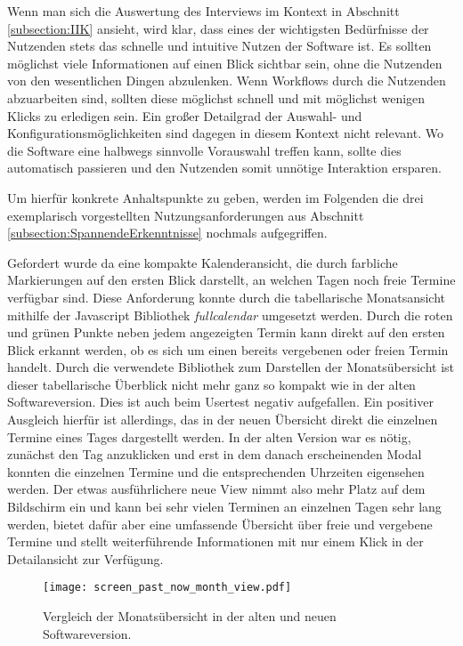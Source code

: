 Wenn man sich die Auswertung des Interviews im Kontext in Abschnitt
\ref{subsection:IIK} ansieht, wird klar, dass eines der wichtigsten Bedürfnisse
der Nutzenden stets das schnelle und intuitive Nutzen der Software ist. Es
sollten möglichst viele Informationen auf einen Blick sichtbar sein, ohne die
Nutzenden von den wesentlichen Dingen abzulenken. Wenn Workflows durch die
Nutzenden abzuarbeiten sind, sollten diese möglichst schnell und mit möglichst
wenigen Klicks zu erledigen sein. Ein großer Detailgrad der Auswahl- und
Konfigurationsmöglichkeiten sind dagegen in diesem Kontext nicht relevant. Wo
die Software eine halbwegs sinnvolle Vorauswahl treffen kann, sollte dies
automatisch passieren und den Nutzenden somit unnötige Interaktion ersparen.

Um hierfür konkrete Anhaltspunkte zu geben, werden im Folgenden die drei
exemplarisch vorgestellten Nutzungsanforderungen aus Abschnitt
\ref{subsection:SpannendeErkenntnisse} nochmals aufgegriffen.

Gefordert wurde da eine kompakte Kalenderansicht, die durch farbliche
Markierungen auf den ersten Blick darstellt, an welchen Tagen noch freie
Termine verfügbar sind. Diese Anforderung konnte durch die tabellarische
Monatsansicht mithilfe der Javascript Bibliothek \textit{fullcalendar}
umgesetzt werden. Durch die roten und grünen Punkte neben jedem angezeigten
Termin kann direkt auf den ersten Blick erkannt werden, ob es sich um einen
bereits vergebenen oder freien Termin handelt. Durch die verwendete Bibliothek
zum Darstellen der Monatsübersicht ist dieser tabellarische Überblick nicht
mehr ganz so kompakt wie in der alten Softwareversion. Dies ist auch \ipName
beim Usertest negativ aufgefallen. Ein positiver Ausgleich hierfür ist
allerdings, das in der neuen Übersicht direkt die einzelnen Termine eines Tages
dargestellt werden. In der alten Version war es nötig, zunächst den Tag
anzuklicken und erst in dem danach erscheinenden Modal konnten die einzelnen
Termine und die entsprechenden Uhrzeiten eigensehen werden. Der etwas
ausführlichere neue View nimmt also mehr Platz auf dem Bildschirm ein und kann
bei sehr vielen Terminen an einzelnen Tagen sehr lang werden, bietet dafür aber
eine umfassende Übersicht über freie und vergebene Termine und stellt
weiterführende Informationen mit nur einem Klick in der Detailansicht zur
Verfügung.

\begin{figure}[H]
    \caption{Vergleich der Monatsübersicht in der alten und neuen Softwareversion.}
    \centering
    \texttt{[image: screen\_past\_now\_month\_view.pdf]}
\end{figure}

